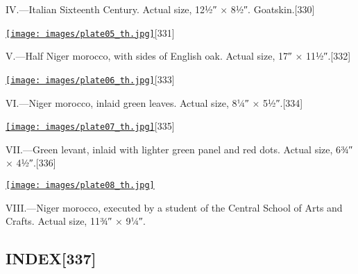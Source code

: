 \documentclass[
]{article}
\begin{document}
IV.---Italian Sixteenth Century. Actual size, 12½″ × 8½″.
Goatskin.{\protect\hypertarget{Page_330}{}{{[}330{]}}}

\href{images/plate05.jpg}{\texttt{[image: images/plate05\_th.jpg]}}{\protect\hypertarget{Page_331}{}{{[}331{]}}}

V.---Half Niger morocco, with sides of English oak. Actual size, 17″ ×
11½″.{\protect\hypertarget{Page_332}{}{{[}332{]}}}

\href{images/plate06.jpg}{\texttt{[image: images/plate06\_th.jpg]}}{\protect\hypertarget{Page_333}{}{{[}333{]}}}

VI.---Niger morocco, inlaid green leaves. Actual size, 8¼″ ×
5½″.{\protect\hypertarget{Page_334}{}{{[}334{]}}}

\href{images/plate07.jpg}{\texttt{[image: images/plate07\_th.jpg]}}{\protect\hypertarget{Page_335}{}{{[}335{]}}}

VII.---Green levant, inlaid with lighter green panel and red dots.
Actual size, 6¾″ × 4½″.{\protect\hypertarget{Page_336}{}{{[}336{]}}}

\href{images/plate08.jpg}{\texttt{[image: images/plate08\_th.jpg]}}

VIII.---Niger morocco, executed by a student of the Central School of
Arts and Crafts. Actual size, 11¾″ × 9¼″.

\hypertarget{index337}{%
\subsection[INDEX]{\texorpdfstring{\protect\hypertarget{INDEX}{}{}INDEX{\protect\hypertarget{Page_337}{}{{[}337{]}}}}{INDEX{[}337{]}}}\label{index337}}
\end{document}
